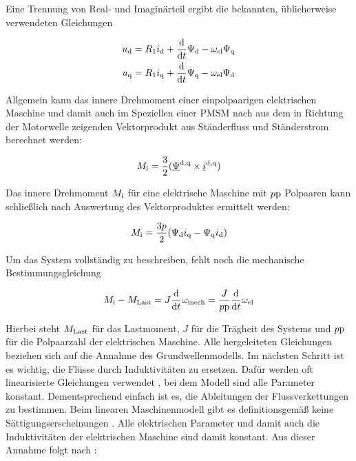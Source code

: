 Eine Trennung von Real- und Imaginärteil ergibt die bekannten, üblicherweise verwendeten Gleichungen \autocite{schroder2001}

	\begin{align}
		u_{\mathrm{d}} &= R_{\mathrm{1}}i_{\mathrm{d}} + \frac{\mathrm{d}}{\mathrm{d}t}\Psi_{\mathrm{d}}-\omega_{\mathrm{el}}\Psi_{\mathrm{q}} \label{eqn:ud-gleichung}\\
		u_{\mathrm{q}} &= R_{\mathrm{1}}i_{\mathrm{q}} + \frac{\mathrm{d}}{\mathrm{d}t}\Psi_{\mathrm{q}}-\omega_{\mathrm{el}}\Psi_{\mathrm{d}} \label{eqn:uq-gleichung}
	\end{align}

Allgemein kann das innere Drehmoment einer einpolpaarigen elektrischen Maschine und damit auch im Speziellen einer PMSM nach \textcite{kellner2012} aus dem in Richtung der Motorwelle zeigenden Vektorprodukt aus Ständerfluss und Ständerstrom berechnet werden:

\begin{align}
	M_{\mathrm{i}} = \frac{3}{2}(\underline{\Psi}^{\mathrm{d,q}} \times \underline{i}^{\mathrm{d,q}}) 
\end{align}

Das innere Drehmoment $M_{\mathrm{i}}$ für eine elektrische Maschine mit $p\mathrm{p}$ Polpaaren kann schließlich nach Auswertung des Vektorproduktes ermittelt werden:

	\begin{align}
M_{\mathrm{i}} = \frac{3p}{2} ( \Psi_{\mathrm{d}}i_{\mathrm{q}} - \Psi_{\mathrm{q}}i_{\mathrm{d}} ) \label{eqn:mi-gleichung}
	\end{align}

Um das System vollständig zu beschreiben, fehlt noch die mechanische Bestimmungsgleichung

\begin{align}
	M_{\mathrm{i}} - M_{\mathrm{Last}} = J \frac{\mathrm{d}}{\mathrm{d}t}\omega_{\mathrm{mech}} = \frac{J}{p\mathrm{p}} \frac{\mathrm{d}}{\mathrm{d}t}\omega_{\mathrm{el}} \label{eqn:mechanische-gleichung}
\end{align}

Hierbei steht $M_{\mathrm{Last}}$ für das Lastmoment, $J$ für die Trägheit des Systems und $p\mathrm{p}$ für die Polpaarzahl der elektrischen Maschine.
Alle hergeleiteten Gleichungen beziehen sich auf die Annahme des Grundwellenmodells.
Im nächsten Schritt ist es wichtig, die Flüsse durch Induktivitäten zu ersetzen.
Dafür werden oft linearisierte Gleichungen verwendet \autocite{schroder2001}, bei dem Modell sind alle Parameter konstant.
Dementsprechend einfach ist es, die Ableitungen der Flussverkettungen zu bestimmen.
Beim linearen Maschinenmodell gibt es definitionsgemäß keine Sättigungserscheinungen \autocites{mullerII2008}{schroder2001}.
Alle elektrischen Parameter und damit auch die Induktivitäten der elektrischen Maschine sind damit konstant.
Aus dieser Annahme folgt nach \autocite{schroder2001}:

